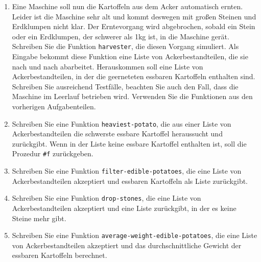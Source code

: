 \begin{aufgabe}
\begin{enumerate}
  \item Eine Maschine soll nun die Kartoffeln aus dem
    Acker automatisch ernten.  Leider ist die Maschine sehr alt und
    kommt deswegen mit großen Steinen und Erdklumpen nicht klar.  Der
    Erntevorgang wird abgebrochen, sobald ein Stein oder ein
    Erdklumpen, der schwerer als 1kg ist, in die Maschine gerät.
    Schreiben Sie die Funktion \texttt{harvester}, die diesen Vorgang
    simuliert. Als Eingabe bekommt diese Funktion eine Liste von
    Ackerbestandteilen, die sie nach und nach abarbeitet.
    Herauskommen soll eine Liste von Ackerbestandteilen, in der die
    geerneteten essbaren Kartoffeln enthalten sind.  Schreiben Sie
    ausreichend Testfälle, beachten Sie auch den Fall, dass die
    Maschine im Leerlauf betrieben wird.  Verwenden Sie die Funktionen
    aus den vorherigen Aufgabenteilen.

  \item Schreiben Sie eine Funktion
    \texttt{heaviest-potato}, die aus einer Liste von
    Ackerbestandteilen die schwerste essbare Kartoffel heraussucht und
    zurückgibt.  Wenn in der Liste keine essbare Kartoffel enthalten ist, soll
    die Prozedur \verb|#f| zurückgeben.

    \item Schreiben Sie eine Funktion
      \texttt{filter-edible-potatoes}, die eine Liste von
      Ackerbestandteilen akzeptiert und essbaren Kartoffeln als Liste
      zurückgibt.

    \item Schreiben Sie eine Funktion
      \texttt{drop-stones}, die eine Liste von Ackerbestandteilen
      akzeptiert und eine Liste zurückgibt, in der es keine Steine mehr
      gibt.

    \item Schreiben Sie eine Funktion
      \texttt{average-weight-edible-potatoes}, die eine Liste von
      Ackerbestandteilen akzeptiert und das durchschnittliche Gewicht
      der essbaren Kartoffeln berechnet.

  \end{enumerate}
  
\end{aufgabe}


